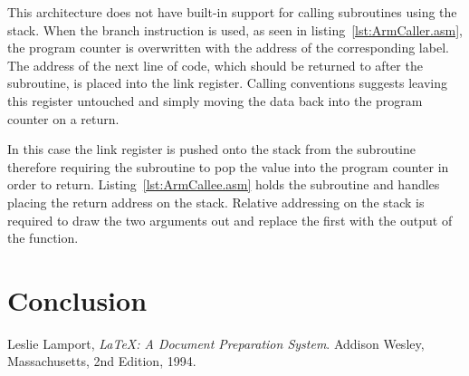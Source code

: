 \documentclass[12pt,a4paper]{article}
\begin{document}
This architecture does not have built-in support for calling subroutines using the stack.
When the branch instruction is used, as seen in listing~\ref{lst:ArmCaller.asm}, the program counter is overwritten with the address of the corresponding label.
The address of the next line of code, which should be returned to after the subroutine, is placed into the link register.
Calling conventions suggests leaving this register untouched and simply moving the data back into the program counter on a return.


In this case the link register is pushed onto the stack from the subroutine therefore requiring the subroutine to pop the value into the program counter in order to return.
Listing~\ref{lst:ArmCallee.asm} holds the subroutine and handles placing the return address on the stack.
Relative addressing on the stack is required to draw the two arguments out and replace the first with the output of the function.







\section{Conclusion}






\renewcommand{\refname}{Bibliography}
\begin{thebibliography}{9}

  Leslie Lamport,
  \emph{\LaTeX: A Document Preparation System}.
  Addison Wesley, Massachusetts,
  2nd Edition,
  1994.

\end{thebibliography}
\end{document}

